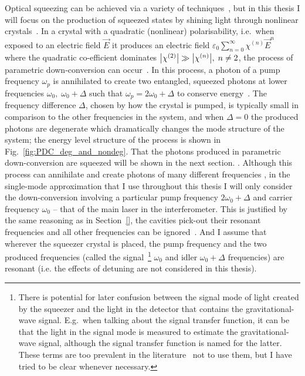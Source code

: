 Optical squeezing can be achieved via a variety of techniques~\cite{}, but in this thesis I will focus on the production of squeezed states by shining light through nonlinear crystals~\cite{}. In a crystal with a quadratic (nonlinear) polarisability, i.e.\ when exposed to an electric field $\vec E$ it produces an electric field $\varepsilon_0 \sum_{n=0}^\infty \chi^{(n)} {\vec E}^n$~\cite{ ref in Kirk thesis?}  where the quadratic co-efficient dominates $\abs{\chi^{(2)}}\gg\abs{\chi^{(n)}},\; n\neq2$, the process of parametric down-conversion can occur~\cite{}. In this process, a photon of a  pump frequency $\omega_p$ is annihilated to create two entangled, squeezed photons at lower frequencies $\omega_0,\; \omega_0+\Delta$ such that $\omega_p=2\omega_0+\Delta$ to conserve energy~\cite{}. The frequency difference $\Delta$, chosen by how the crystal is pumped, is typically small in comparison to the other frequencies in the system, and when $\Delta=0$ the produced photons are degenerate which dramatically changes the mode structure of the system; the energy level structure of the process is shown in Fig.~\ref{fig:PDC_deg_and_nondeg}. That the photons produced in parametric down-conversion are squeezed will be shown in the next section. %
. Although this process can annihilate and create photons of many different frequencies , in the single-mode approximation that I use throughout this thesis I will only consider the down-conversion involving a particular pump frequency $2\omega_0+\Delta$ and carrier frequency $\omega_0$ -- that of the main laser in the interferometer. This is justified by the same reasoning as in Section~\ref{}, the cavities pick-out their resonant frequencies and all other frequencies can be ignored~\cite{}. And I assume that wherever the squeezer crystal is placed, the pump frequency and the two produced frequencies (called the signal~\footnote{There is potential for later confusion between the signal mode of light created by the squeezer and the light in the detector that contains the gravitational-wave signal. E.g.\ when talking about the signal transfer function, it can be that the light in the signal mode is measured to estimate the gravitational-wave signal, although the signal transfer function is named for the latter. These terms are too prevalent in the literature~\cite{} not to use them, but I have tried to be clear whenever necessary.} $\omega_0$ and idler $\omega_0+\Delta$ frequencies) are resonant (i.e. the effects of detuning are not considered in this thesis).

